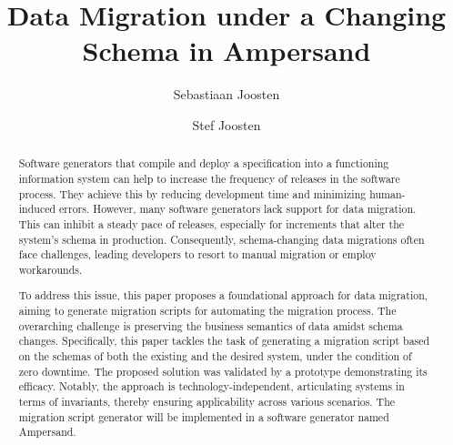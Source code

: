 \documentclass[runningheads]{llncs}
\newcommand{\ourtheory}{approach}
\newcommand{\foundtheory}{foundational approach}
\begin{document}
%

\title{Data Migration under a Changing Schema in Ampersand}
%
%
\author{Sebastiaan Joosten\\ \and
Stef Joosten}
%
%
%
\maketitle              %
%
\begin{abstract}
   Software generators that compile and deploy a specification into a functioning information system
   can help to increase the frequency of releases in the software process.
   They achieve this by reducing development time and minimizing human-induced errors.
   However, many software generators lack support for data migration.
   This can inhibit a steady pace of releases, especially for increments that alter the system's schema in production.
   Consequently, schema-changing data migrations often face challenges, leading developers to resort to manual migration or employ workarounds.

   To address this issue, this paper proposes a \foundtheory{} for data migration,
   aiming to generate migration scripts for automating the migration process.
   The overarching challenge is preserving the business semantics of data amidst schema changes.
   Specifically, this paper tackles the task of generating a migration script based on the schemas of both the existing and the desired system,
   under the condition of zero downtime.
   The proposed solution was validated by a prototype demonstrating its efficacy.
   Notably, the \ourtheory{} is technology-independent, articulating systems in terms of invariants, thereby ensuring applicability across various scenarios.
   The migration script generator will be implemented in a software generator named Ampersand.
\end{abstract}
\end{document}
